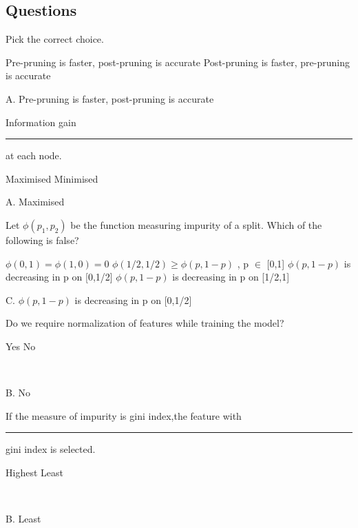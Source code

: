 \documentclass[12pt,letterpaper, onecolumn]{exam}
\begin{document}
\subsection*{Questions}

\begin{questions}
\question[] Pick the correct choice.
\begin{choices}
    \choice Pre-pruning is faster, post-pruning is accurate
    \choice Post-pruning is faster, pre-pruning is accurate
  \end{choices} 
  \begin{Solution}
  A. Pre-pruning is faster, post-pruning is accurate
  \end{Solution}
  \question[] Information gain \rule{2cm}{0.15mm} at each node.
  \begin{choices}
    \choice Maximised
    \choice Minimised
  \end{choices} 
  \begin{Solution}
  A. Maximised
  \end{Solution}
 \question[]Let $\phi(p_1,p_2)$ be the function measuring impurity of a split. Which of the following is false?
   \begin{choices}
    \choice $\phi(0,1)=\phi(1,0) = 0$
    \choice $\phi(1/2,1/2) \geq \phi(p,1-p)$ , p $\in$ [0,1]
    \choice $\phi(p,1-p)$  is decreasing in p on [0,1/2]
    \choice $\phi(p,1-p)$  is decreasing in p on [1/2,1]
  \end{choices} 
  \begin{Solution}
  C.  $\phi(p,1-p)$  is decreasing in p on [0,1/2]
  \end{Solution}
  \question[] Do we require normalization of features while training the model?\\
  \begin{oneparchoices}
    \choice Yes
    \choice No
  \end{oneparchoices}\\
  \begin{Solution}
  B. No
  \end{Solution}
  \question[] If the measure of impurity is gini index,the feature with \rule{2cm}{0.15mm} gini index is selected.\\
  \begin{oneparchoices}
    \choice Highest
    \choice Least
  \end{oneparchoices}\\
  \begin{Solution}
  B. Least
  \end{Solution}
  
\end{questions}
\end{document}
